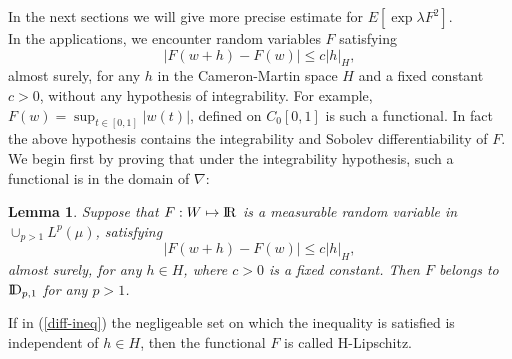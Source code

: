 \documentclass[12pt,a4paper]{book}
\newtheorem{lemma}[theorem]{Lemma}
\newcommand{\DD}{{\rm I\!D}}
\newcommand{\R}{{\rm I\!R}}
\newcommand{\remark}{\noindent {\bf Remark:\ }}
\begin{document}
\remark In the next  sections  we will give more  precise estimate for
$E[\exp \lambda F^2]$.\\
\newline
In the applications, we encounter random variables $F$ satisfying
$$
|F(w+h)-F(w)|\leq c |h|_H,
$$
almost surely, for any $h$ in the Cameron-Martin space $H$ and a fixed
constant $c>0$, without any hypothesis of integrability. For example,
$F(w)=\sup_{t\in [0,1]}|w(t)|$, defined on $C_0[0,1]$ is such a
functional. In fact the above
hypothesis contains the integrability and Sobolev differentiability  of $F$.
We begin first by proving that under the integrability hypothesis,
such a functional is in the domain of $\nabla$:
\begin{lemma}
\label{lemma-bir}
Suppose that $F:W\mapsto \R$ is a measurable random variable in
$\cup_{p>1}L^p(\mu)$, satisfying
\begin{equation}
\label{diff-ineq}
|F(w+h)-F(w)|\leq c |h|_H,
\end{equation}
almost surely, for any $h\in H$, where $c>0$ is a fixed constant. Then $F$
belongs to $\DD_{p,1}$ for any $p>1$.
\end{lemma}

\remark If in (\ref{diff-ineq})  the negligeable set on which the
inequality is satisfied is independent of $h\in H$,  then the
functional $F$ is called  H-Lipschitz.
\end{document}
